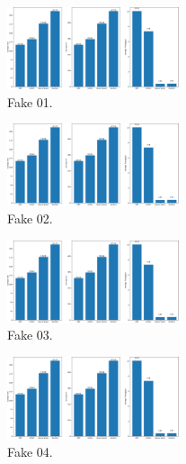     \begin{figure}[hbt]
        \centering
        \includegraphics[width=0.45\textwidth]{images/bar_graph.pdf}
        \caption{Fake 01.}
        \label{fig:fake_01}
    \end{figure}
    \begin{figure}[hbt]
        \centering
        \includegraphics[width=0.45\textwidth]{images/bar_graph.pdf}
        \caption{Fake 02.}
        \label{fig:fake_02}
    \end{figure}
    \begin{figure}[hbt]
        \centering
        \includegraphics[width=0.45\textwidth]{images/bar_graph.pdf}
        \caption{Fake 03.}
        \label{fig:fake_03}
    \end{figure}
    \begin{figure}[hbt]
        \centering
        \includegraphics[width=0.45\textwidth]{images/bar_graph.pdf}
        \caption{Fake 04.}
        \label{fig:fake_04}
    \end{figure}

